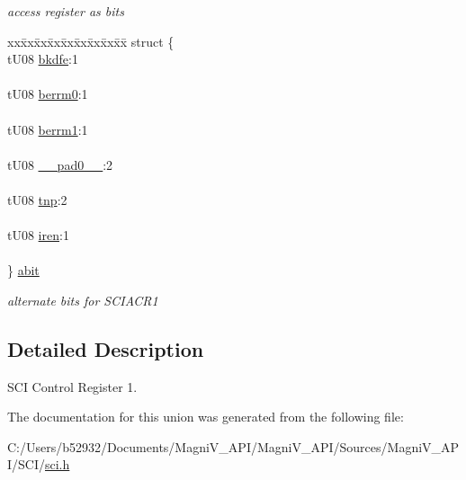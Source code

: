 \begin{DoxyCompactItemize}
\begin{tabbing}
\end{tabbing}\begin{DoxyCompactList}\small\item\em access register as bits \end{DoxyCompactList}\item 
\hypertarget{unionu_s_c_i_c_r1_a0f24db7e8a164886523033afed7bc4de}{}\begin{tabbing}
xx\=xx\=xx\=xx\=xx\=xx\=xx\=xx\=xx\=\kill
struct \{\\
\>tU08 \hyperlink{unionu_s_c_i_c_r1_a0f43f80db778744f4764347ff6f4d839}{bkdfe}:1\\
\>\\
\>tU08 \hyperlink{unionu_s_c_i_c_r1_a08b998db26bde60fa3f84949399aa795}{berrm0}:1\\
\>\\
\>tU08 \hyperlink{unionu_s_c_i_c_r1_aa8b62bf5cae234384943f930e146c0dc}{berrm1}:1\\
\>\\
\>tU08 \hyperlink{unionu_s_c_i_c_r1_aa3e5250d311ceb1525f9adf38f0d7982}{\_\_pad0\_\_}:2\\
\>\\
\>tU08 \hyperlink{unionu_s_c_i_c_r1_a85630b949936b19c709bff2e9f8b198f}{tnp}:2\\
\>\\
\>tU08 \hyperlink{unionu_s_c_i_c_r1_a2b6202cb93c6149682a201b528080d13}{iren}:1\\
\>\\
\} \hyperlink{unionu_s_c_i_c_r1_a0f24db7e8a164886523033afed7bc4de}{abit}\label{unionu_s_c_i_c_r1_a0f24db7e8a164886523033afed7bc4de}
\\

\end{tabbing}\begin{DoxyCompactList}\small\item\em alternate bits for S\+C\+I\+A\+C\+R1 \end{DoxyCompactList}\end{DoxyCompactItemize}


\subsection{Detailed Description}
S\+C\+I Control Register 1. 

The documentation for this union was generated from the following file\+:\begin{DoxyCompactItemize}
\item 
C\+:/\+Users/b52932/\+Documents/\+Magni\+V\+\_\+\+A\+P\+I/\+Magni\+V\+\_\+\+A\+P\+I/\+Sources/\+Magni\+V\+\_\+\+A\+P\+I/\+S\+C\+I/\hyperlink{sci_8h}{sci.\+h}\end{DoxyCompactItemize}
